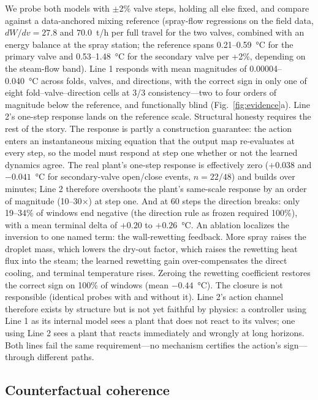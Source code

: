 \documentclass{article}
\begin{document}
We probe both models with $\pm$2\% valve steps, holding all else fixed, and compare
against a data-anchored mixing reference (spray-flow regressions on the field data,
$dW/dv = 27.8$ and $70.0$~t/h per full travel for the two valves, combined with an
energy balance at the spray station; the reference spans 0.21--0.59~\si{\degreeCelsius}
for the primary valve and 0.53--1.48~\si{\degreeCelsius} for the secondary valve per
+2\%, depending on the steam-flow band). Line 1 responds with mean magnitudes of
0.00004--0.040~\si{\degreeCelsius} across folds, valves, and directions, with the
correct sign in only one of eight fold--valve--direction cells at 3/3 consistency---two
to four orders of magnitude below the reference, and functionally blind
(Fig.~\ref{fig:evidence}a). Line 2's one-step response lands on the reference scale.
Structural honesty requires the rest of the story. The response is partly a
construction guarantee: the action enters an instantaneous mixing equation that the
output map re-evaluates at every step, so the model must respond at step one whether
or not the learned dynamics agree. The real plant's one-step response is effectively
zero ($+0.038$ and $-0.041$~\si{\degreeCelsius} for secondary-valve open/close events,
$n=22/48$) and builds over minutes; Line 2 therefore overshoots the plant's
same-scale response by an order of magnitude (10--30$\times$) at step one. And at 60
steps the direction breaks: only 19--34\% of windows end negative (the direction
rule as frozen required 100\%), with a mean terminal delta of $+0.20$ to
$+0.26$~\si{\degreeCelsius}. An ablation localizes the inversion
to one named term: the wall-rewetting feedback. More spray raises the droplet mass,
which lowers the dry-out factor, which raises the rewetting heat flux into the steam;
the learned rewetting gain over-compensates the direct cooling, and terminal
temperature rises. Zeroing the rewetting coefficient restores the correct sign on
100\% of windows (mean $-0.44$~\si{\degreeCelsius}). The closure is not responsible
(identical probes with and without it). Line 2's action channel therefore exists by
structure but is not yet faithful by physics: a controller using Line 1 as its
internal model sees a plant that does not react to its valves; one using Line 2 sees a
plant that reacts immediately and wrongly at long horizons. Both lines fail the same
requirement---no mechanism certifies the action's sign---through different paths.

\subsection{Counterfactual coherence}
\end{document}
